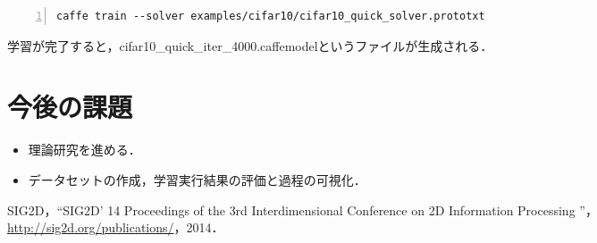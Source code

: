 \documentclass[a4paper,10pt]{jsarticle}
\begin{document}
\begin{lstlisting}[basicstyle=\ttfamily\footnotesize, frame=single, firstnumber=1, numbers=left, breaklines=true]
caffe train --solver examples/cifar10/cifar10_quick_solver.prototxt
\end{lstlisting}

学習が完了すると，cifar10\_quick\_iter\_4000.caffemodelというファイルが生成される．

\section{今後の課題}
\begin{itemize}
 \item 理論研究を進める．
 \item データセットの作成，学習実行結果の評価と過程の可視化．
\end{itemize}


\begin{thebibliography}{99}
   SIG2D，``SIG2D' 14 Proceedings of the 3rd Interdimensional Conference on 2D Information Processing ''，\url{http://sig2d.org/publications/}，2014．
\end{thebibliography}
\end{document}
